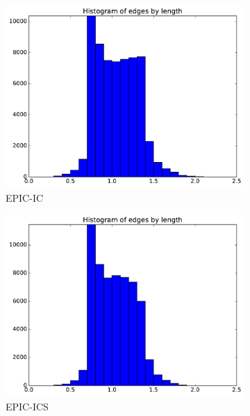 \documentclass[3p,times,procedia,number]{elsarticle}
\begin{document}
\begin{figure}
\begin{subfigure}{.24\textwidth}
\centering
\includegraphics[width=\textwidth]{epic-ic-cube-linear-length.pdf}
\caption{EPIC-IC}
\end{subfigure}
\begin{subfigure}{.24\textwidth}
\centering
\includegraphics[width=\textwidth]{epic-ics-cube-linear-length.pdf}
\caption{EPIC-ICS}
\end{subfigure}
\begin{subfigure}{.24\textwidth}
\centering

\end{subfigure}
\end{figure}
\end{document}
